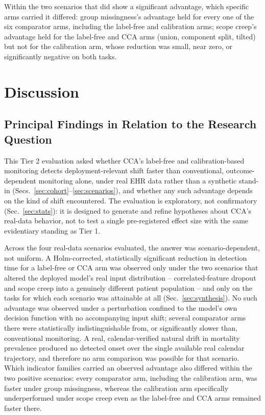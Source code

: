 \documentclass[preprintsapa,article,submit,oneauthor]{Definitions/mdpi}
\begin{document}
Within the two scenarios that did show a significant advantage, which specific arms carried it differed: group missingness's advantage held for every one of the six comparator arms, including the label-free and calibration arms; scope creep's advantage held for the label-free and CCA arms (union, component split, tilted) but not for the calibration arm, whose reduction was small, near zero, or significantly negative on both tasks.

\section{Discussion}\label{sec:discussion}

\subsection{Principal Findings in Relation to the Research Question}\label{sec:disc-findings}

This Tier 2 evaluation asked whether CCA's label-free and calibration-based monitoring detects deployment-relevant shift faster than conventional, outcome-dependent monitoring alone, under real EHR data rather than a synthetic stand-in (Secs.~\ref{sec:cohort}--\ref{sec:scenarios}), and whether any such advantage depends on the kind of shift encountered. The evaluation is exploratory, not confirmatory (Sec.~\ref{sec:stats}): it is designed to generate and refine hypotheses about CCA's real-data behavior, not to test a single pre-registered effect size with the same evidentiary standing as Tier 1.

Across the four real-data scenarios evaluated, the answer was scenario-dependent, not uniform. A Holm-corrected, statistically significant reduction in detection time for a label-free or CCA arm was observed only under the two scenarios that altered the deployed model's real input distribution -- correlated-feature dropout and scope creep into a genuinely different patient population -- and only on the tasks for which each scenario was attainable at all (Sec.~\ref{sec:synthesis}). No such advantage was observed under a perturbation confined to the model's own decision function with no accompanying input shift; several comparator arms there were statistically indistinguishable from, or significantly slower than, conventional monitoring. A real, calendar-verified natural drift in mortality prevalence produced no detected onset over the single available real calendar trajectory, and therefore no arm comparison was possible for that scenario. Which indicator families carried an observed advantage also differed within the two positive scenarios: every comparator arm, including the calibration arm, was faster under group missingness, whereas the calibration arm specifically underperformed under scope creep even as the label-free and CCA arms remained faster there.
\end{document}
